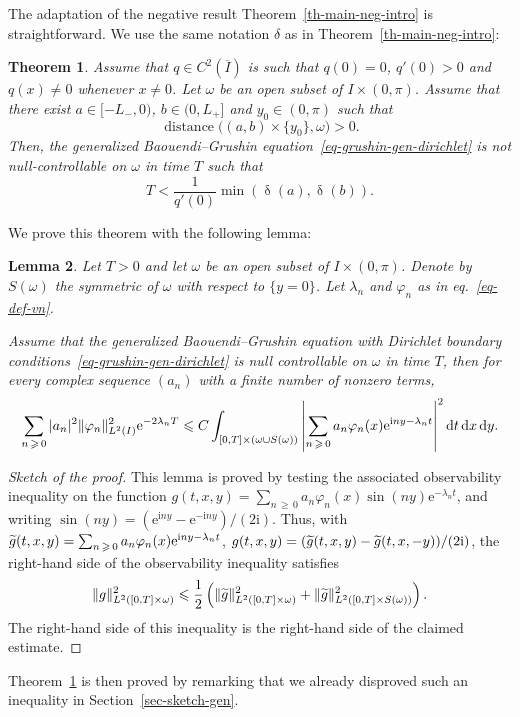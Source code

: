 \documentclass[10pt]{amsart}
\newtheorem{theo}{Theorem}[section]
\newtheorem{lemm}[theo]{Lemma}\newtheorem{prop}[theo]{Proposition}\newtheorem{coro}[theo]{Corollary}\newtheorem{conj}[theo]{Conjecture}
\theoremstyle{definition}\newtheorem{defi}[theo]{Definition}\newtheorem{rema}[theo]{Remark}\newtheorem{exam}[theo]{Example}\newtheorem{exem}[theo]{Example}\newtheorem{nota}[theo]{Notation}
\renewcommand{\leq}{\leqslant}
\renewcommand{\geq}{\geqslant}
\newcommand{\1}{\mathds 1}
\DeclareMathOperator{\distance}{distance}
\DeclareMathOperator{\dagmontilde}{\delta}
\newcommand{\diff}[1][-3]{\ensuremath{\mathop{}\mkern#1mu\mathrm{d}}}
\newcommand{\eu}{\mathrm e}
\newcommand{\iu}{\mathrm i}
\renewcommand{\d}{\delta}
\renewcommand{\l}{\lambda}
\newcommand{\f}{\varphi}
\renewcommand{\o}{\omega}
\let\oldtilde\tilde
\renewcommand*{\tilde}[1]{\mathchoice{\widetilde{#1}}{\widetilde{#1}}{\oldtilde{#1}}{\oldtilde{#1}}}
\begin{document}
The adaptation of the negative result Theorem~\ref{th-main-neg-intro} is straightforward. We use the same notation $\d$ as in Theorem~\ref{th-main-neg-intro}:

\begin{theo}\label{th-main-neg-dirichlet}
Assume that $q\in C^2(\overline I)$ is such that $q(0) = 0$, $q'(0) > 0$ and $q(x) \neq 0$ whenever $x\neq 0$. Let $\o$ be an open subset of $I\times (0,\pi)$. Assume that there exist $a \in [-L_-,0)$, $b \in (0,L_+]$ and $y_0 \in (0,\pi)$ such that
\[
\distance\big((a,b)\times \{y_0\}, \o\big) > 0.
\]
Then, the generalized Baouendi--Grushin equation~\eqref{eq-grushin-gen-dirichlet} is not null-controllable on $\o$ in time $T$ such that
\[
T< \frac{1}{q'(0)}\min \left(\dagmontilde(a),\dagmontilde(b) \right).
\]
\end{theo}

We prove this theorem with the following lemma:
\begin{lemm}
Let $T>0$ and let $\omega$ be an open subset of $I\times (0,\pi)$. Denote by $S(\omega)$ the symmetric of $\omega$ with respect to $\{y = 0\}$. Let $\l_n$ and $\f_n$ as in eq.~\eqref{eq-def-vn}.

Assume that the generalized Baouendi--Grushin equation with Dirichlet boundary conditions~\eqref{eq-grushin-gen-dirichlet} is null controllable on $\omega$ in time $T$, then for every complex sequence $(a_n)$ with a finite number of nonzero terms,
\[
\sum_{n\,\geq\,0} |a_n|^2 \|\f_n\|^2_{L^2(I)}\eu^{-2\l_n T} \leq C \int_{[0,T]\times (\o \cup S(\o))} \left|\sum_{n\,\geq\,0} a_n \f_n(x) \eu^{\iu n y - \l_n t}\right|^2 \diff t \diff x \diff y.
\]
\end{lemm}

\begin{proof}[Sketch of the proof]
This lemma is proved by testing the associated observability inequality on the function $g(t,x,y) = \sum_{n\,\geq\,0} a_n \f_n(x)\sin(ny) \eu^{-\l_n t}$, and writing $\sin(ny) = (\eu^{\iu ny} - \eu^{-\iu ny})/(2\iu)$. Thus, with $\tilde g(t,x,y) = \sum_{n\,\geq\,0} a_n \f_n(x)\eu^{\iu n y - \l_n t}$, $g(t,x,y) = (\tilde g(t,x,y) - \tilde g(t,x,-y))/(2\iu)$, the right-hand side of the observability inequality satisfies
\[
\|g\|_{L^2([0,T]\times \o)}^2 \leq \dfrac12 \left(\|\tilde g\|_{L^2([0,T]\times \o)}^2 + \|\tilde g\|^2_{L^2([0,T]\times S(\o))}\right).
\]
The right-hand side of this inequality is the right-hand side of the claimed estimate.
\end{proof}

Theorem~\ref{th-main-neg-dirichlet} is then proved by remarking that we already disproved such an inequality in Section~\ref{sec-sketch-gen}.
\end{document}
